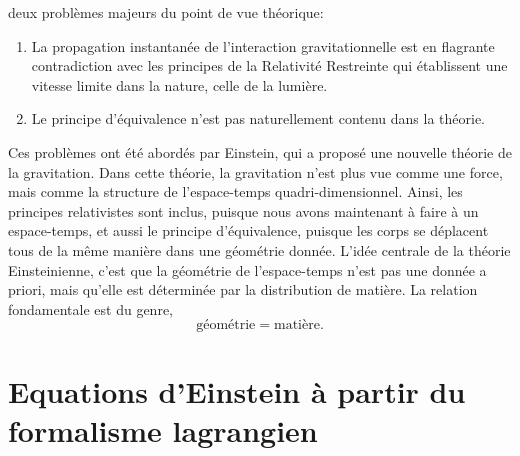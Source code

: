 \documentclass[a4paper,12pt]{report}
\theoremstyle{plain}
\theoremstyle{plain}
\begin{document}
deux probl\`emes majeurs du point de vue th\'eorique: 
\begin{enumerate}
\item La propagation instantan\'ee de l'interaction
gravitationnelle est en flagrante contradiction avec les principes
de la Relativit\'e Restreinte qui \'etablissent une vitesse limite
dans la nature,  celle de la lumi\`ere. \item Le principe d'\'equivalence n'est pas naturellement contenu dans la th\'eorie. 
\end{enumerate}
\par
Ces probl\`emes ont \'et\'e abord\'es par Einstein,  qui a
propos\'e une nouvelle th\'eorie de la gravitation.  Dans cette
th\'eorie,  la gravitation n'est plus vue comme une force,  mais
comme la structure de l'espace-temps quadri-dimensionnel.  Ainsi, 
les principes relativistes sont inclus,  puisque nous avons
maintenant \`a faire \`a un espace-temps,  et aussi le principe d'\'equivalence,  puisque les corps se d\'eplacent tous de la m\^eme
mani\`ere dans une g\'eom\'etrie donn\'ee.  L'id\'ee centrale de la
th\'eorie Einsteinienne, c'est que la g\'eom\'etrie de
l'espace-temps n'est pas une donn\'ee a priori,  mais qu'elle est
d\'etermin\'ee par la distribution de mati\`ere.  La relation
fondamentale est du genre, 
\begin{equation}
\mbox{g\'eom\'etrie} = \mbox{mati\`ere}.
\end{equation}
 
 

\section{Equations d'Einstein \`a partir du formalisme lagrangien}
\end{document}
